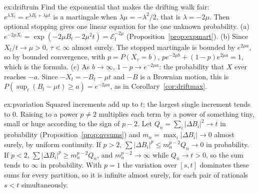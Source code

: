 \begin{solution}{ex:driftruin}
\idea Find the exponential that makes the drifting walk fair: $e^{\lambda X_t}=e^{\lambda B_t+\lambda\mu t}$ is a martingale when $\lambda\mu=-\lambda^2/2$, that is $\lambda=-2\mu$. Then optional stopping gives one linear
equation for the one unknown probability.
\writeup (a) $e^{-2\mu X_t}=\exp(-2\mu B_t-2\mu^2t)=\mathcal E^{-2\mu}_t$ (Proposition~\ref{prop:expmart}). (b) Since $X_t/t\to\mu>0$, $\tau<\infty$ almost surely. The stopped martingale is bounded by $e^{2\mu a}$, so by
bounded convergence, with $p=P(X_\tau=b)$, $pe^{-2\mu b}+(1-p)e^{2\mu a}=1$, which is the formula. (c) As $b\to\infty$, $1-p\to e^{-2\mu a}$: the probability that $X$ ever reaches $-a$. Since $-X_t=-B_t-\mu t$ and
$-B$ is a Brownian motion, this is $P(\sup_t(B_t-\mu t)\ge a)=e^{-2\mu a}$, as in Corollary~\ref{cor:driftmax}.
\end{solution}

\begin{solution}{ex:pvariation}
\idea Squared increments add up to $t$; the largest single increment tends to $0$. Raising to a power $p\ne2$ multiplies each term by a power of something tiny, small or huge according to the sign of $p-2$.
\writeup Let $Q_n=\sum_i|\Delta B_i|^2\to t$ in probability (Proposition~\ref{prop:qvsums}) and $m_n=\max_i|\Delta B_i|\to0$ almost surely, by uniform continuity. If $p>2$, $\sum|\Delta B_i|^p\le m_n^{p-2}Q_n\to0$ in probability.
If $p<2$, $\sum|\Delta B_i|^p\ge m_n^{p-2}Q_n$, and $m_n^{p-2}\to\infty$ while $Q_n\to t>0$, so the sum tends to $\infty$ in probability. With $p=1$ the variation over $[s,t]$ dominates these sums for every partition,
so it is infinite almost surely, for each pair of rationals $s<t$ simultaneously.
\end{solution}

